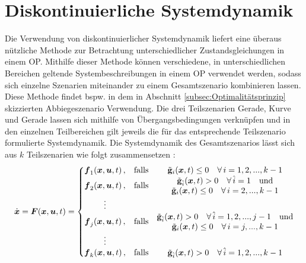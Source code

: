 \section{Diskontinuierliche Systemdynamik}\label{sec:Diskontinuität}
Die Verwendung von diskontinuierlicher Systemdynamik liefert eine überaus nützliche Methode zur Betrachtung unterschiedlicher Zustandsgleichungen in einem \gls{OP}. Mithilfe dieser Methode können verschiedene, in unterschiedlichen Bereichen geltende Systembeschreibungen in einem \gls{OP} verwendet werden, sodass sich einzelne Szenarien miteinander zu einem Gesamtszenario kombinieren lassen. Diese Methode findet bspw. in dem in Abschnitt \ref{subsec:Optimalitätsprinzip} skizzierten Abbiegeszenario Verwendung. Die drei Teilszenarien Gerade, Kurve und Gerade lassen sich mithilfe von Übergangsbedingungen verknüpfen und in den einzelnen Teilbereichen gilt jeweils die für das entsprechende Teilszenario formulierte Systemdynamik. Die Systemdynamik des Gesamtszenarios lässt sich aus $k$ Teilszenarien wie folgt zusammensetzen \cite{Papageorgiou.2012}:
\begin{equation}
\dot{\boldsymbol{x}} = \boldsymbol{F}(\boldsymbol{x},\boldsymbol{u},t) = \left\{\begin{matrix}
\boldsymbol{f}_1(\boldsymbol{x},\boldsymbol{u},t)\,, & \mathrm{falls} & \begin{matrix}\tilde{\mathbf{g}}_i(\boldsymbol{x},t) \leq 0 \quad\forall\, i = 1,2,...,k-1\end{matrix}\\
\boldsymbol{f}_2(\boldsymbol{x},\boldsymbol{u},t)\,, & \mathrm{falls} & \begin{matrix}
\tilde{\mathbf{g}}_{\hat{i}}(\boldsymbol{x},t) > 0 \quad\forall\, \hat{i} = 1 \quad\textrm{und} \\ \tilde{\mathbf{g}}_i(\boldsymbol{x},t) \leq 0 \quad\forall\, i = 2,...,k-1
\end{matrix}\\
\vdots & & \\
\boldsymbol{f}_j(\boldsymbol{x},\boldsymbol{u},t)\,, & \mathrm{falls} & \begin{matrix}
\tilde{\mathbf{g}}_{\hat{i}}(\boldsymbol{x},t) > 0 \quad\forall \, \hat{i} = 1,2,...,j-1 \quad\textrm{und} \\ \tilde{\mathbf{g}}_i(\boldsymbol{x},t) \leq 0 \quad\forall\, i = j,...,k-1
\end{matrix}\\
\vdots & & \\
\boldsymbol{f}_k(\boldsymbol{x},\boldsymbol{u},t)\,, & \mathrm{falls} & \begin{matrix}\tilde{\mathbf{g}}_{\hat{i}}(\boldsymbol{x},t) > 0 \quad\forall\, \hat{i} = 1,2,...,k-1
\end{matrix}
\end{matrix}\right. \label{eq:Diskontinuität}
\end{equation}
